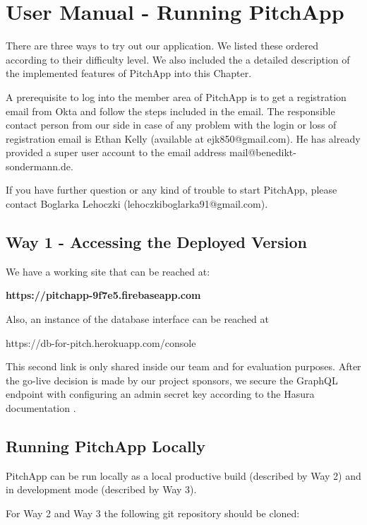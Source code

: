 \chapter{User Manual - Running PitchApp}


There are three ways to try out our application. We listed these ordered according to their difficulty level. We also included the a detailed description of the implemented features of PitchApp into this Chapter.

A prerequisite to log into the member area of PitchApp is to get a registration email from Okta and follow the steps included in the email. The responsible contact person from our side in case of any problem with the login or loss of registration email is Ethan Kelly (available at ejk850@gmail.com). He has already provided a super user account to the email address mail@benedikt-sondermann.de.

If you have further question or any kind of trouble to start PitchApp, please contact Boglarka Lehoczki (lehoczkiboglarka91@gmail.com).

\section{Way 1 - Accessing the Deployed Version}

We have a working site that can be reached at:

\textbf{https://pitchapp-9f7e5.firebaseapp.com}

Also, an instance of the database interface can be reached at

https://db-for-pitch.herokuapp.com/console

This second link is only shared inside our team and for evaluation purposes. After the go-live decision is made by our project sponsors, we secure the GraphQL endpoint with configuring an admin secret key according to the Hasura documentation \parencite{Secure_Endpoint}.

\section{Running PitchApp Locally}

PitchApp can be run locally as a local productive build (described by Way 2) and in development mode (described by Way 3).

For Way 2 and Way 3 the following git repository should be cloned:

